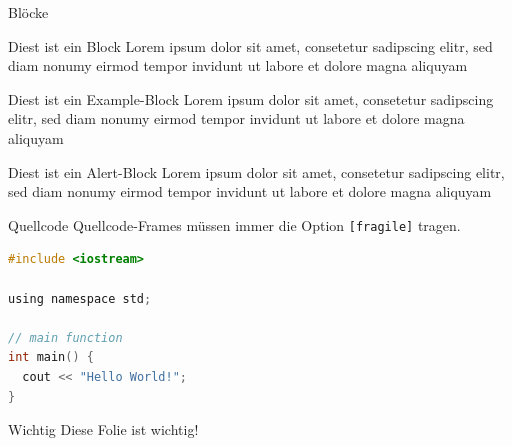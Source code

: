 \documentclass[fleqn,11pt,aspectratio=43]{beamer}
\begin{document}
\begin{frame}{Blöcke}
  \begin{block}{Diest ist ein Block}
    Lorem ipsum dolor sit amet, consetetur sadipscing elitr, sed diam
    nonumy eirmod tempor invidunt ut labore et dolore magna aliquyam
  \end{block}
  \begin{exampleblock}{Diest ist ein Example-Block}
    Lorem ipsum dolor sit amet, consetetur sadipscing elitr, sed diam
    nonumy eirmod tempor invidunt ut labore et dolore magna aliquyam
  \end{exampleblock}
  \begin{alertblock}{Diest ist ein Alert-Block}
    Lorem ipsum dolor sit amet, consetetur sadipscing elitr, sed diam
    nonumy eirmod tempor invidunt ut labore et dolore magna aliquyam
  \end{alertblock}
\end{frame}


\begin{frame}[fragile]{Quellcode}
Quellcode-Frames müssen immer die Option \texttt{[fragile]} tragen.
\begin{lstlisting}[language=c]
#include <iostream>

using namespace std;

// main function
int main() {
  cout << "Hello World!";
}
\end{lstlisting}
\end{frame}


\begin{frame}[highlight]{Wichtig}
Diese Folie ist wichtig!
\end{frame}
\end{document}
